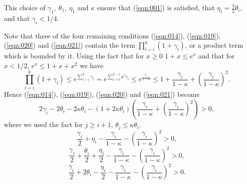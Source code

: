 \documentclass[12pt,leqno]{article}
\theoremstyle{plain}
\numberwithin{equation}{section}
\begin{document}
This choice of $\gamma_1,\ \theta_1, \ \eta_1$ and $\kappa$ ensure
that (\ref{eqn:001}) is satisfied, that $\eta_i= \frac{3}{2}\theta_i$,
and that $\gamma_i<1/4$.


Note that three of the four remaining conditions (\ref{eqn:014}),
(\ref{eqn:019}), (\ref{eqn:020}) and (\ref{eqn:021}) contain the term
$\prod^{k}_{l=i}(1+\gamma_l)$, or a product term which is bounded by it.
Using the fact that for $x\ge 0$ $1+x\le e^x$ and that for $x<1/2$,
$e^x\le 1+x+x^2$ we have
\begin{equation}\label{eqn:026}
\prod^{k}_{l=i}(1+\gamma_l)\le  e^{\sum_{l=i}^k\gamma_l} =e^{\sum_{l=0}^{k-i}
\kappa^l\gamma_i}\le  e^{\frac{\gamma_i}{1-\kappa}}\le
1+ \frac{\gamma_i}{1-\kappa}
+\left(\frac{\gamma_i}{1-\kappa}\right)^2.
\end{equation}
Hence
(\ref{eqn:014}),
(\ref{eqn:019}), (\ref{eqn:020}) and (\ref{eqn:021}) become
\begin{equation}\label{eqn:014N}
2\gamma_i-2\theta_i-2\kappa\theta_i-(1+2\kappa\theta_i)
\left( \frac{\gamma_i}{1-\kappa}
+\left(\frac{\gamma_i}{1-\kappa}\right)^2\right)>0,
\end{equation}
where we used the fact for $j\ge i+1$, $\theta_j\le \kappa\theta_i$.
\begin{equation}\label{eqn:019N}
\frac{\gamma_i}{2}+\eta_i- \frac{\gamma_i}{1-\kappa}
-\left(\frac{\gamma_i}{1-\kappa}\right)^2>0,
\end{equation}
\begin{equation}\label{eqn:020N}
\frac{\gamma_i}{2}+\frac{\theta_i}{2}+\frac{\eta_i}{2}-
 \frac{\gamma_i}{1-\kappa}
-\left(\frac{\gamma_i}{1-\kappa}\right)^2>0,
\end{equation}
\begin{equation}\label{eqn:021N}
\frac{\gamma_i}{2}+2{\theta_i}-\frac{\eta_i}{2}
- \frac{\gamma_i}{1-\kappa}
-\left(\frac{\gamma_i}{1-\kappa}\right)^2>0.
\end{equation}
\end{document}
